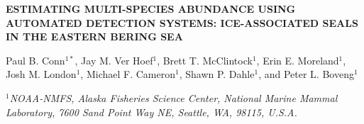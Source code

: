 \documentclass[12pt,fleqn]{article}
\begin{document}
\begin{center} \bf {\large ESTIMATING MULTI-SPECIES ABUNDANCE USING AUTOMATED DETECTION SYSTEMS: ICE-ASSOCIATED SEALS IN THE EASTERN BERING SEA}

\vspace{0.7cm}
Paul B. Conn$^{1*}$, Jay M. Ver Hoef$^1$, Brett T. McClintock$^1$, Erin E. Moreland$^1$, Josh M. London$^1$, Michael F. Cameron$^1$, Shawn P. Dahle$^1$, and Peter L. Boveng$^1$
\end{center}
\vspace{0.5cm}

\rm
\small

\it $^1$NOAA-NMFS, Alaska Fisheries Science Center, National Marine Mammal Laboratory, 7600 Sand Point Way NE, Seattle, WA, 98115, U.S.A.\\
\end{document}
